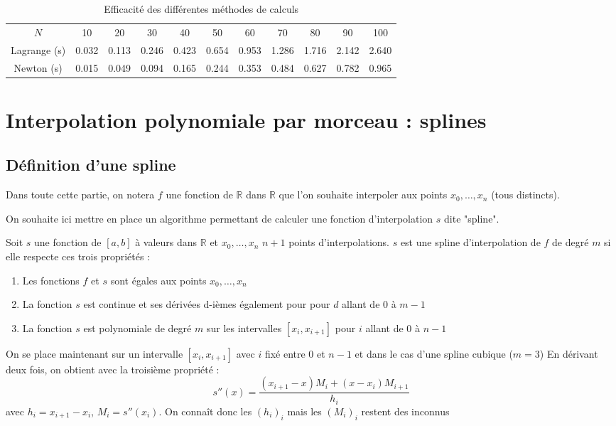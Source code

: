 \begin{table}[h]
  \centering
\begin{tabular}{ccccccccccc}
    $N$ & 10 & 20 & 30 & 40 & 50 & 60 & 70 & 80 & 90 & 100 \\
   Lagrange (s) & 0.032 & 0.113 & 0.246 & 0.423 & 0.654 & 0.953 & 1.286 & 1.716 & 2.142 & 2.640 \\
   Newton (s) & 0.015 & 0.049 & 0.094 & 0.165 & 0.244 & 0.353 & 0.484 & 0.627 & 0.782 & 0.965 \\
\end{tabular}
  \caption{Efficacité des différentes méthodes de calculs}
  \label{table:compNewtonLagrange}
\end{table}



\chapter{Interpolation polynomiale par morceau : splines}

\section{Définition d'une spline}

Dans toute cette partie, on notera $f$ une fonction de $\mathbb{R}$ 
dans $\mathbb{R}$ que l'on souhaite interpoler aux points 
$x_0, \dots, x_n$ (tous distincts).

On souhaite ici mettre en place un algorithme 
permettant de calculer une fonction d'interpolation $s$ dite "spline".

\begin{definition}
Soit $s$ une fonction de $[a,b]$ à valeurs dans $\mathbb{R}$ et 
$x_0, \dots, x_n$ $n+1$ points d'interpolations. $s$ est une spline d'interpolation de $f$ de degré $m$ si elle respecte
ces trois propriétés :
\begin{enumerate}
\item Les fonctions $f$ et $s$ sont égales aux points $x_0, \dots, x_n$
\item La fonction $s$ est continue et ses dérivées d-ièmes également pour pour $d$ allant de $0$ à $m-1$
\item La fonction $s$ est polynomiale de degré $m$ sur les intervalles $[x_i,x_{i+1}]$ pour $i$ allant de $0$ à $n-1$
\end{enumerate}
\end{definition}

On se place maintenant sur un intervalle $[x_i,x_{i+1}]$ avec $i$ fixé entre 0 et $n-1$ et dans le cas d'une spline cubique ($m = 3$)
En dérivant deux fois, on obtient avec la troisième propriété :
\[
s''(x) = \frac{(x_{i+1} - x)M_i + (x - x_i)M_{i+1}}{h_i}
\]
avec $h_i = x_{i+1} - x_i$, $M_i = s''(x_i)$. On connaît donc les $(h_i)_i$ mais les $(M_i)_i$ restent des inconnus


